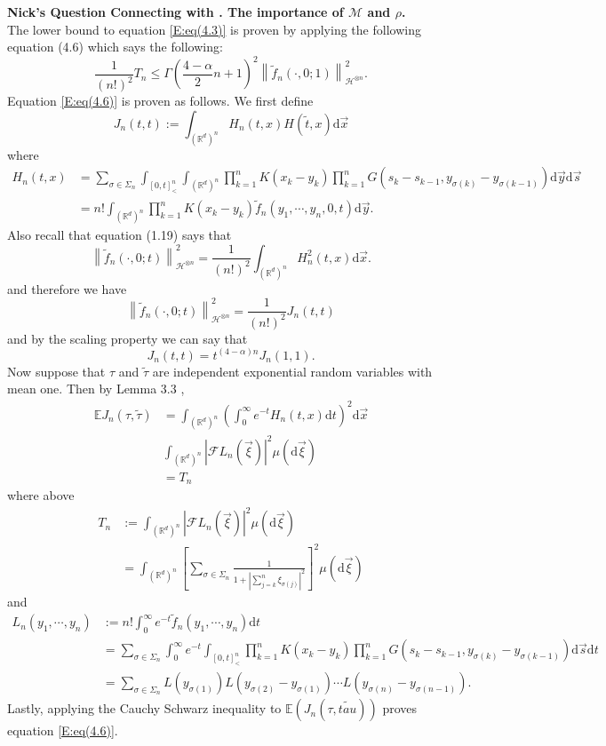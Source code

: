 \documentclass[a4paper,11pt]{article}
\numberwithin{equation}{section}
\theoremstyle{plain}
\theoremstyle{definition}
\newcommand{\ud}{\ensuremath{\mathrm{d} }}
\newcommand{\Norm}[1]{\left\|  #1   \right\|}
\newcommand{\R}{\mathbb{R}}
\newcounter{NQ}
\newenvironment{NickQuestion}[1][] %
{\refstepcounter{NQ}
	\begin{mdframed}[backgroundcolor=lightgray]\textbf{Nick's Question \theNQ \: #1~~}~~~\noindent}%
	{\end{mdframed}}
\numberwithin{NQ}{section}
\numberwithin{LQ}{section}
\numberwithin{ZQ}{section}
\begin{document}
\begin{NickQuestion}[Connecting \cite{BCC21} with \cite{BCR09}. The importance of $\mathcal{M}$ and $\rho$.]
The lower bound to equation \eqref{E:eq(4.3)} is proven by applying the following equation (4.6) \cite{BCC21} which says the following:
	\begin{equation}\label{E:eq(4.6)}
		\frac{1}{(n!)^{2}}T_n \le \Gamma\left( \frac{4- \alpha}{2}n +1 \right)^2 \Norm{\tilde{f}_n(\cdot,0;1)}_{\mathcal{H}^{\otimes n}}^2.
	\end{equation}
Equation \eqref{E:eq(4.6)} is proven as follows. We first define
	\[
		J_n(t,t) := \int_{(\R^d)^n} H_n(t,x)H(\tilde{t},x) \ud \vec{x}
	\]
where
	\begin{align*}
		 H_n(t,x) &= \sum_{\sigma \in \Sigma_n} \int_{[0,t]_<^n} \int_{(\R^d)^n} \prod_{k=1}^n K(x_k-y_k) \prod_{k=1}^n G(s_k-s_{k-1},y_{\sigma(k)}-y_{\sigma(k-1)}) \ud \vec{y} \ud \vec{s}
\\ & = n! \int_{(\R^d)^n} \prod_{k=1}^n K(x_k-y_k) \tilde{f}_n(y_1,\cdots,y_n,0,t) \ud \vec{y}.
	\end{align*}
Also recall that equation (1.19) \cite{BCC21} says that
	\[
		\Norm{\tilde{f}_n(\cdot,0;t)}_{\mathcal{H}^{\otimes n}}^2 = \frac{1}{(n!)^2} \int_{(\R^d)^n} H_n^2(t,x) \ud \vec{x}.
	\]
and therefore we have
	\[
		\Norm{\tilde{f}_n(\cdot,0;t)}_{\mathcal{H}^{\otimes n}}^2 =  \frac{1}{(n!)^2} J_n(t,t)
	\]
and by the scaling property we can say that
	\[
		J_n(t,t) = t^{(4-\alpha)n}J_n(1,1).
	\]
Now suppose that $\tau$ and $\tilde{\tau}$ are independent exponential random variables with mean one. Then by Lemma 3.3 \cite{BCC21},
	\begin{align*}
		\mathbb{E}J_n(\tau,\tilde{\tau}) &= \int_{(\R^d)^n} \left( \int_0^{\infty} e^{-t} H_n(t,x) \ud t\right)^2 \ud \vec{x}
\\ & \int_{(\R^d)^n} \left| \mathcal{F}L_n(\vec{\xi}) \right|^2 \mu(\ud \vec{\xi})
\\ & = T_n
	\end{align*}
where above
	\begin{align*}
		T_n &:= \int_{(\R^d)^n} \left| \mathcal{F}L_n(\vec{\xi}) \right|^2 \mu(\ud \vec{\xi})
\\ & = \int_{(\R^d)^n} \left[ \sum_{\sigma \in \Sigma_n} \frac{1}{ 1 + \left| \sum_{j=k}^n \xi_{\sigma(j)} \right|^2 } \right]^2 \mu( \ud \vec{\xi})
	\end{align*}
and
	\begin{align*}
		L_n(y_1,\cdots, y_n) &:= n! \int_0^\infty e^{-t} \tilde{f}_n(y_1,\cdots,y_n) \ud t
\\ & = \sum_{\sigma \in \Sigma_{n}} \int_0^\infty e^{-t} \int_{[0,t]^n_<} \prod_{k=1}^n K(x_k-y_k) \prod_{k=1}^n G(s_k - s_{k-1}, y_{\sigma(k)}-y_{\sigma(k-1)}) \ud \vec{s} \ud t
\\ & = \sum_{\sigma \in \Sigma_{n}} L(y_{\sigma(1)}) L( y_{\sigma(2)} - y_{\sigma(1)} )\cdots L( y_{\sigma(n)} - y_{\sigma(n-1)} ).
	\end{align*}
Lastly, applying the Cauchy Schwarz inequality to $\mathbb{E}(J_n(\tau,\tilde{tau}))$ proves equation \eqref{E:eq(4.6)}.


\end{NickQuestion}
\end{document}
